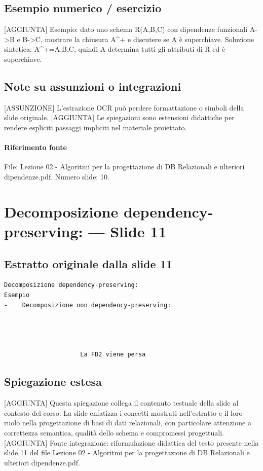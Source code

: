 \documentclass[11pt]{article}
\begin{document}
\subsection*{Esempio numerico / esercizio}
[AGGIUNTA] Esempio: dato uno schema R(A,B,C) con dipendenze funzionali A->B e B->C, mostrare la chiusura A^+ e discutere se A è superchiave. Soluzione sintetica: A^+={A,B,C}, quindi A determina tutti gli attributi di R ed è superchiave.
\subsection*{Note su assunzioni o integrazioni}
[ASSUNZIONE] L'estrazione OCR può perdere formattazione o simboli della slide originale.
[AGGIUNTA] Le spiegazioni sono estensioni didattiche per rendere espliciti passaggi impliciti nel materiale proiettato.
\paragraph{Riferimento fonte} File: Lezione 02 - Algoritmi per la progettazione di DB Relazionali e ulteriori dipendenze.pdf. Numero slide: 10.
\section{Decomposizione dependency-preserving: --- Slide 11}
\subsection*{Estratto originale dalla slide 11}
\begin{lstlisting}
Decomposizione dependency-preserving:
Esempio
-    Decomposizione non dependency-preserving:




                     La FD2 viene persa
\end{lstlisting}
\subsection*{Spiegazione estesa}
[AGGIUNTA] Questa spiegazione collega il contenuto testuale della slide al contesto del corso. La slide enfatizza i concetti mostrati nell'estratto e il loro ruolo nella progettazione di basi di dati relazionali, con particolare attenzione a correttezza semantica, qualità dello schema e compromessi progettuali.
[AGGIUNTA] Fonte integrazione: riformulazione didattica del testo presente nella slide 11 del file Lezione 02 - Algoritmi per la progettazione di DB Relazionali e ulteriori dipendenze.pdf.
\end{document}
